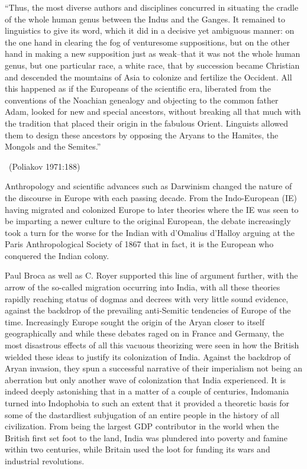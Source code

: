 \begin{myquote}
“Thus, the most diverse authors and disciplines concurred in situating the cradle of the whole human genus between the Indus and the Ganges. It remained to linguistics to give its word, which it did in a decisive yet ambiguous manner: on the one hand in clearing the fog of venturesome suppositions, but on the other hand in making a new supposition just as weak--that it was not the whole human genus, but one particular race, a white race, that by succession became Christian and descended the mountains of Asia to colonize and fertilize the Occident. All this happened as if the Europeans of the scientific era, liberated from the conventions of the Noachian genealogy and objecting to the common father Adam, looked for new and special ancestors, without breaking all that much with the tradition that placed their origin in the fabulous Orient. Linguists allowed them to design these ancestors by opposing the Aryans to the Hamites, the Mongols and the Semites.”

~\hfill (Poliakov 1971:188)
\end{myquote}

Anthropology and scientific advances such as Darwinism changed the nature of the discourse in Europe with each passing decade. From the Indo-European (IE) having migrated and colonized Europe to later theories where the IE was seen to be imparting a newer culture to the original European, the debate increasingly took a turn for the worse for the Indian with d'Omalius d'Halloy arguing at the Paris Anthropological Society of 1867 that in fact, it is the European who conquered the Indian colony.

Paul Broca as well as C. Royer supported this line of argument further, with the arrow of the so-called migration occurring into India, with all these theories rapidly reaching status of dogmas and decrees with very little sound evidence, against the backdrop of the prevailing anti-Semitic tendencies of Europe of the time. Increasingly Europe sought the origin of the Aryan closer to itself geographically and while these debates raged on in France and Germany, the most disastrous effects of all this vacuous theorizing were seen in how the British wielded these ideas to justify its colonization of India. Against the backdrop of Aryan invasion, they spun a successful narrative of their imperialism not being an aberration but only another wave of colonization that India experienced. It is indeed deeply astonishing that in a matter of a couple of centuries, Indomania turned into Indophobia to such an extent that it provided a theoretic basis for some of the dastardliest subjugation of an entire people in the history of all civilization. From being the largest GDP contributor in the world when the British first set foot to the land, India was plundered into poverty and famine within two centuries, while Britain used the loot for funding its wars and industrial revolutions.


